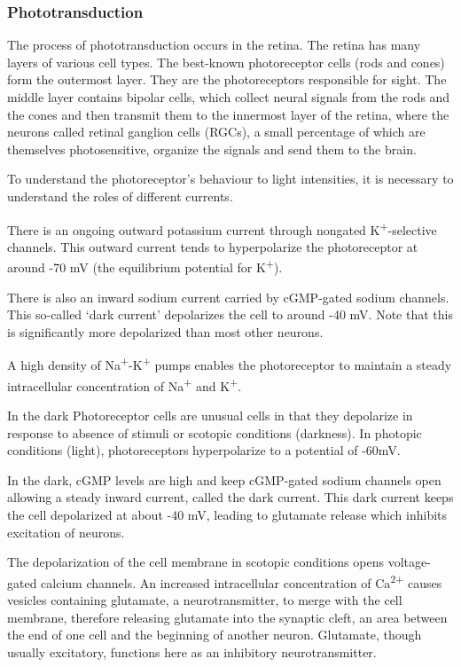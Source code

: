 \documentclass[]{book}
\begin{document}
\hypertarget{phototransduction}{%
\subsubsection{Phototransduction}\label{phototransduction}}

The process of phototransduction occurs in the retina. The retina has many layers of various cell types. The best-known photoreceptor cells (rods and cones) form the outermost layer. They are the photoreceptors responsible for sight. The middle layer contains bipolar cells, which collect neural signals from the rods and the cones and then transmit them to the innermost layer of the retina, where the neurons called retinal ganglion cells (RGCs), a small percentage of which are themselves photosensitive, organize the signals and send them to the brain.

To understand the photoreceptor's behaviour to light intensities, it is necessary to understand the roles of different currents.

There is an ongoing outward potassium current through nongated K\textsuperscript{+}-selective channels. This outward current tends to hyperpolarize the photoreceptor at around -70 mV (the equilibrium potential for K\textsuperscript{+}).

There is also an inward sodium current carried by cGMP-gated sodium channels. This so-called `dark current' depolarizes the cell to around -40 mV. Note that this is significantly more depolarized than most other neurons.

A high density of Na\textsuperscript{+}-K\textsuperscript{+} pumps enables the photoreceptor to maintain a steady intracellular concentration of Na\textsuperscript{+} and K\textsuperscript{+}.

In the dark
Photoreceptor cells are unusual cells in that they depolarize in response to absence of stimuli or scotopic conditions (darkness). In photopic conditions (light), photoreceptors hyperpolarize to a potential of -60mV.

In the dark, cGMP levels are high and keep cGMP-gated sodium channels open allowing a steady inward current, called the dark current. This dark current keeps the cell depolarized at about -40 mV, leading to glutamate release which inhibits excitation of neurons.

The depolarization of the cell membrane in scotopic conditions opens voltage-gated calcium channels. An increased intracellular concentration of Ca\textsuperscript{2+} causes vesicles containing glutamate, a neurotransmitter, to merge with the cell membrane, therefore releasing glutamate into the synaptic cleft, an area between the end of one cell and the beginning of another neuron. Glutamate, though usually excitatory, functions here as an inhibitory neurotransmitter.
\end{document}
